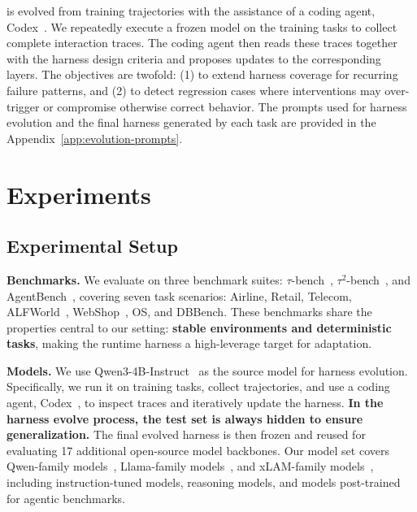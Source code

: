 \method{} is evolved from training trajectories with the assistance of a coding
agent, Codex~\cite{openai2026codexcli}. We repeatedly execute a frozen model on the training tasks to collect complete interaction traces. The coding agent then reads these traces together with the harness design criteria and proposes updates to the corresponding layers. The objectives are twofold: (1) to extend harness coverage for recurring failure patterns, and (2) to detect regression cases where interventions may over-trigger or compromise otherwise correct behavior. The prompts used for harness evolution and the final harness generated by each task are provided in the Appendix~\ref{app:evolution-prompts}.

\section{Experiments}
\subsection{Experimental Setup}
\label{sec:exp-setup}

\textbf{Benchmarks.}
We evaluate \method{} on three benchmark suites: \(\tau\)-bench~\cite{yao2024tau_tau-bench},
\(\tau^2\)-bench~\cite{barres2025tau_tau2-bench}, and AgentBench~\cite{liu2024agentbench}, covering seven task scenarios:
{Airline}, {Retail}, {Telecom}, {ALFWorld}~\cite{shridhar2020alfworld},
{WebShop}~\cite{yao2022webshop}, {OS}, and {DBBench}. These benchmarks share the properties central to our setting: \textbf{stable environments and deterministic tasks}, making the runtime harness a high-leverage target for
adaptation.

\noindent \textbf{Models.}
We use Qwen3-4B-Instruct~\cite{qwen3technicalreport} as the source model for harness evolution.
Specifically, we run it on training tasks, collect trajectories, and use a
coding agent, Codex~\cite{openai2026codexcli}, to inspect traces and iteratively update the harness. \textbf{In the harness evolve process, the test set is always hidden to ensure generalization.} The final evolved harness is then frozen and reused for evaluating 17 additional open-source model backbones. Our model set covers Qwen-family
models~\cite{qwen2.5,qwen3technicalreport,qwen3.5}, Llama-family models~\cite{dubey2024llama}, and xLAM-family models~\cite{prabhakar2026apigen_Salesforce_xLAM2},
including instruction-tuned models, reasoning models, and models post-trained for agentic benchmarks.

